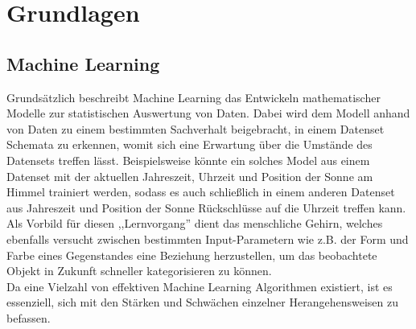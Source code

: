 \clearpage
\chapter{\textbf{Grundlagen}}\label{grundlagen}

\section{Machine Learning}\label{unterkapitel}

Grundsätzlich beschreibt Machine Learning das Entwickeln mathematischer Modelle zur statistischen Auswertung
von Daten. Dabei wird dem Modell anhand von Daten zu einem bestimmten Sachverhalt beigebracht, in einem 
Datenset Schemata zu erkennen, womit sich eine Erwartung über die Umstände des Datensets treffen lässt.
Beispielsweise könnte ein solches Model aus einem Datenset mit der aktuellen Jahreszeit, Uhrzeit und 
Position der Sonne am Himmel trainiert werden, sodass es auch schließlich in einem anderen Datenset 
aus Jahreszeit und Position der Sonne Rückschlüsse auf die Uhrzeit treffen kann.\\
Als Vorbild für diesen ,,Lernvorgang'' dient das menschliche Gehirn, welches ebenfalls versucht zwischen 
bestimmten Input-Parametern wie z.B. der Form und Farbe eines Gegenstandes eine Beziehung herzustellen,
um das beobachtete Objekt in Zukunft schneller kategorisieren zu können.\\
Da eine Vielzahl von effektiven Machine Learning Algorithmen existiert, ist es essenziell, sich mit den
Stärken und Schwächen einzelner Herangehensweisen zu befassen.\newpage


